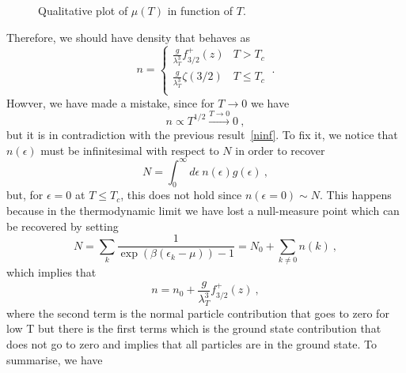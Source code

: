     \begin{figure}[h!]
        \centering
        \caption{Qualitative plot of $\mu(T)$ in function of $T$.}
        \label{fig:mu}
    \end{figure}

    Therefore, we should have density that behaves as 
    \begin{equation*}
        n = \begin{cases}
            \frac{g}{\lambda_T^3} f^+_{3/2} (z) & T > T_c \\
            \frac{g}{\lambda_T^3} \zeta(3/2) & T \leq T_c \\
        \end{cases} ~.
    \end{equation*}
    Howver, we have made a mistake, since for $T \rightarrow 0$ we have 
    \begin{equation*}
        n \propto T^{1/2} \xrightarrow{T \rightarrow 0} 0 ~,
    \end{equation*}
    but it is in contradiction with the previous result~\eqref{ninf}. To fix it, we notice that $n(\epsilon)$ must be infinitesimal with respect to $N$ in order to recover 
    \begin{equation*}
        N = \int_0^\infty d\epsilon ~ n(\epsilon) g(\epsilon) ~,
    \end{equation*}
    but, for $\epsilon = 0$ at $T \leq T_c$, this does not hold since $n(\epsilon = 0) \sim N$. This happens because in the thermodynamic limit we have lost a null-measure point which can be recovered by setting 
    \begin{equation*}
        N = \sum_k \frac{1}{\exp(\beta(\epsilon_k - \mu)) - 1} = N_0 + \sum_{k\neq 0} n(k) ~,
    \end{equation*}
    which implies that 
    \begin{equation*}
        n = n_0 + \frac{g}{\lambda_T^3} f^+_{3/2} (z) ~,
    \end{equation*}
    where the second term is the normal particle contribution that goes to zero for low T but there is the first terms which is the ground state contribution that does not go to zero and implies that all particles are in the ground state. To summarise, we have 

